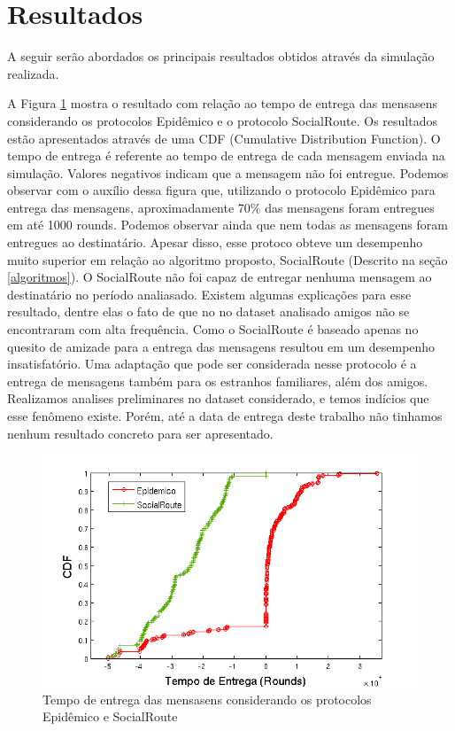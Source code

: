 \section{Resultados}\label{sec:figs}

A seguir serão abordados os principais resultados obtidos através da
simulação realizada.

A Figura \ref{fig:Epidemico_SocialRoute} mostra o resultado com relação
ao tempo de entrega das mensasens considerando os protocolos Epidêmico e
o protocolo SocialRoute. Os resultados estão apresentados através de uma
CDF (Cumulative Distribution Function). O tempo de entrega é referente
ao tempo de entrega de cada mensagem enviada na simulação. Valores
negativos indicam que a mensagem não foi entregue. Podemos observar com
o auxílio dessa figura que, utilizando o protocolo Epidêmico para
entrega das mensagens, aproximadamente 70\% das mensagens foram
entregues em até 1000 rounds. Podemos observar ainda que nem todas as
mensagens foram entregues ao destinatário. Apesar disso, esse protoco
obteve um desempenho muito superior em relação ao algoritmo proposto,
SocialRoute (Descrito na seção \ref{algoritmos}). O SocialRoute não foi
capaz de entregar nenhuma mensagem ao destinatário no período
analiasado. Existem algumas explicações para esse resultado, dentre elas
o fato de que no no dataset analisado amigos não se encontraram com alta
frequência. Como o SocialRoute é baseado apenas no quesito de amizade
para a entrega das mensagens resultou em um desempenho insatisfatório.
Uma adaptação que pode ser considerada nesse protocolo é a entrega de
mensagens também para os estranhos familiares, além dos amigos.
Realizamos analises preliminares no dataset considerado, e temos
indícios que esse fenômeno existe. Porém, até a data de entrega deste
trabalho não tinhamos nenhum resultado concreto para ser apresentado.

\begin{figure}[ht]
\centering
\includegraphics[width=.7\textwidth]{img/tempo_epidemico_socialRoute.png}
\caption{Tempo de entrega das mensasens considerando os protocolos
Epidêmico e SocialRoute}
\label{fig:Epidemico_SocialRoute}
\end{figure}

